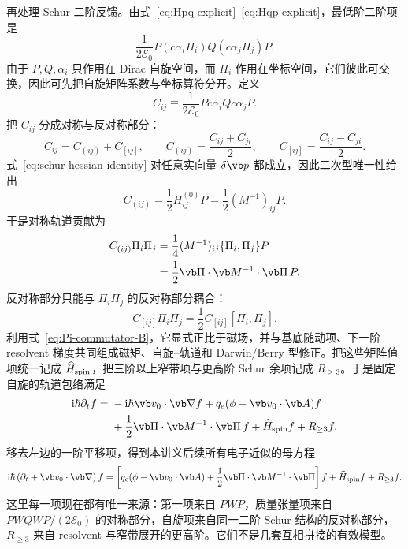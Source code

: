 再处理 Schur 二阶反馈。由式~\cref{eq:Hpq-explicit}--\cref{eq:Hqp-explicit}，最低阶二阶项是
\begin{equation}
\frac{1}{2\mathcal E_0}
P(c\alpha_i\Pi_i)Q(c\alpha_j\Pi_j)P.
\label{eq:schur-second-operator-start}
\end{equation}
由于 $P,Q,\alpha_i$ 只作用在 Dirac 自旋空间，而 $\Pi_i$ 作用在坐标空间，它们彼此可交换，因此可先把自旋矩阵系数与坐标算符分开。定义
\begin{equation}
C_{ij}\equiv
\frac{1}{2\mathcal E_0}Pc\alpha_iQc\alpha_jP.
\end{equation}
把 $C_{ij}$ 分成对称与反对称部分：
\begin{equation}
C_{ij}=C_{(ij)}+C_{[ij]},
\qquad
C_{(ij)}=\frac{C_{ij}+C_{ji}}{2},
\qquad
C_{[ij]}=\frac{C_{ij}-C_{ji}}{2}.
\end{equation}
式~\cref{eq:schur-hessian-identity} 对任意实向量 $\delta\vb p$ 都成立，因此二次型唯一性给出
\begin{equation}
{
C_{(ij)}=\frac12H_{ij}^{(0)}P
=\frac12(M^{-1})_{ij}P.}
\label{eq:Cij-symmetric-mass}
\end{equation}
于是对称轨道贡献为
\begin{align}
C_{(ij)}\Pi_i\Pi_j
&=\frac14(M^{-1})_{ij}\{\Pi_i,\Pi_j\}P\\
&=\frac12\vb\Pi\cdot\vb M^{-1}\cdot\vb\Pi\,P.
\label{eq:schur-orbital-operator}
\end{align}
反对称部分只能与 $\Pi_i\Pi_j$ 的反对称部分耦合：
\begin{equation}
C_{[ij]}\Pi_i\Pi_j
=\frac12C_{[ij]}[\Pi_i,\Pi_j].
\end{equation}
利用式~\cref{eq:Pi-commutator-B}，它显式正比于磁场，并与基底随动项、下一阶 resolvent 梯度共同组成磁矩、自旋--轨道和 Darwin/Berry 型修正。把这些矩阵值项统一记成 $\widehat H_{\rm spin}$，把三阶以上窄带项与更高阶 Schur 余项记成 $R_{\ge3}$。于是固定自旋的轨道包络满足
\begin{align}
\ii\hbar\partial_t f
={}&-\ii\hbar\vb v_0\cdot\vb\nabla f
+q_{\rm e}(\phi-\vb v_0\cdot\vb A)f\\
&+\frac12\vb\Pi\cdot\vb M^{-1}\cdot\vb\Pi\,f
+\widehat H_{\rm spin}f+R_{\ge3}f.
\end{align}
移去左边的一阶平移项，得到本讲义后续所有电子近似的母方程
\begin{equation}
{
\ii\hbar\left(\partial_t+\vb v_0\cdot\vb\nabla\right)f
=\left[
q_{\rm e}(\phi-\vb v_0\cdot\vb A)
+\frac12\vb\Pi\cdot\vb M^{-1}\cdot\vb\Pi
\right]f
+\widehat H_{\rm spin}f+R_{\ge3}f.}
\label{eq:rel-envelope-tensor}
\end{equation}
这里每一项现在都有唯一来源：第一项来自 $PWP$，质量张量项来自 $PWQWP/(2\mathcal E_0)$ 的对称部分，自旋项来自同一二阶 Schur 结构的反对称部分，$R_{\ge3}$ 来自 resolvent 与窄带展开的更高阶。它们不是几套互相拼接的有效模型。

